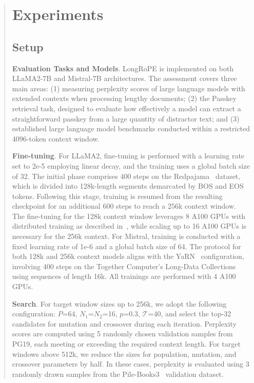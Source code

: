 \begin{abstract}
 \section{Experiments}

\label{sec:exp}
\subsection{Setup}
\textbf{Evaluation Tasks and Models}. LongRoPE is implemented on both LLaMA2-7B and Mistral-7B architectures. The assessment covers three main areas: (1) measuring perplexity scores of large language models with extended contexts when processing lengthy documents; (2) the Passkey retrieval task, designed to evaluate how effectively a model can extract a straightforward passkey from a large quantity of distractor text; and (3) established large language model benchmarks conducted within a restricted 4096-token context window.

\textbf{Fine-tuning}. For LLaMA2, fine-tuning is performed with a learning rate set to 2e-5 employing linear decay, and the training uses a global batch size of 32. The initial phase comprises 400 steps on the Redpajama~\cite{redpajama} dataset, which is divided into 128k-length segments demarcated by BOS and EOS tokens. Following this stage, training is resumed from the resulting checkpoint for an additional 600 steps to reach a 256k context window. The fine-tuning for the 128k context window leverages 8 A100 GPUs with distributed training as described in~\cite{cube}, while scaling up to 16 A100 GPUs is necessary for the 256k context. For Mistral, training is conducted with a fixed learning rate of 1e-6 and a global batch size of 64. The protocol for both 128k and 256k context models aligns with the YaRN~\cite{yarn} configuration, involving 400 steps on the Together Computer's Long-Data Collections~\cite{mistraldata} using sequences of length 16k. All trainings are performed with 4 A100 GPUs.

\textbf{Search}. For target window sizes up to 256k, we adopt the following configuration: $P$=64, $N_1$=$N_2$=16, $p$=0.3, $\mathcal{T}$=40, and select the top-32 candidates for mutation and crossover during each iteration. Perplexity scores are computed using 5 randomly chosen validation samples from PG19, each meeting or exceeding the required context length. For target windows above 512k, we reduce the sizes for population, mutation, and crossover parameters by half. In these cases, perplexity is evaluated using 3 randomly drawn samples from the Pile-Books3~\cite{pile} validation dataset.


\end{abstract}

